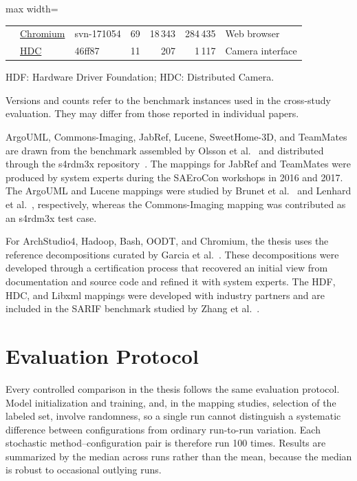 \begin{table}[!htb]
\begin{adjustbox}{max width=\textwidth}
\begin{threeparttable}
\begin{tabular}{@{} c l l r r r l @{}}
& \href{https://www.chromium.org/}{Chromium} & svn-171054 & 69 & 18\,343 & 284\,435 & Web browser \\
& \href{https://gitee.com/openharmony/distributed_camera}{HDC} & 46ff87 & 11 & 207 & 1\,117 & Camera interface \\
\bottomrule
\end{tabular}
\begin{tablenotes}[flushleft]
\small
\item HDF: Hardware Driver Foundation; HDC: Distributed Camera.
\item Versions and counts refer to the benchmark instances used in the cross-study evaluation. They may differ from those reported in individual papers.
\end{tablenotes}
\end{threeparttable}
\end{adjustbox}
\end{table}

ArgoUML, Commons-Imaging, JabRef, Lucene, SweetHome-3D, and TeamMates are drawn from the benchmark assembled by Olsson et al.~\cite{olsson2022automatically} and distributed through the s4rdm3x repository~\cite{olsson2021s4rdm3x}. The mappings for JabRef and TeamMates were produced by system experts during the SAEroCon workshops in 2016 and 2017. The ArgoUML and Lucene mappings were studied by Brunet et al.~\cite{Brunet_gt} and Lenhard et al.~\cite{lenhard2019exploring}, respectively, whereas the Commons-Imaging mapping was contributed as an s4rdm3x test case.
 
For ArchStudio4, Hadoop, Bash, OODT, and Chromium, the thesis uses the reference decompositions curated by Garcia et al.~\cite{garcia2013,turbomq}. These decompositions were developed through a certification process that recovered an initial view from documentation and source code and refined it with system experts. The HDF, HDC, and Libxml mappings were developed with industry partners and are included in the SARIF benchmark studied by Zhang et al.~\cite{sarif}.

\section{Evaluation Protocol \label{sec:eval-protocol}}

Every controlled comparison in the thesis follows the same evaluation protocol. Model initialization and training, and, in the mapping studies, selection of the labeled set, involve randomness, so a single run cannot distinguish a systematic difference between configurations from ordinary run-to-run variation. Each stochastic method--configuration pair is therefore run 100 times. Results are summarized by the median across runs rather than the mean, because the median is robust to occasional outlying runs.

